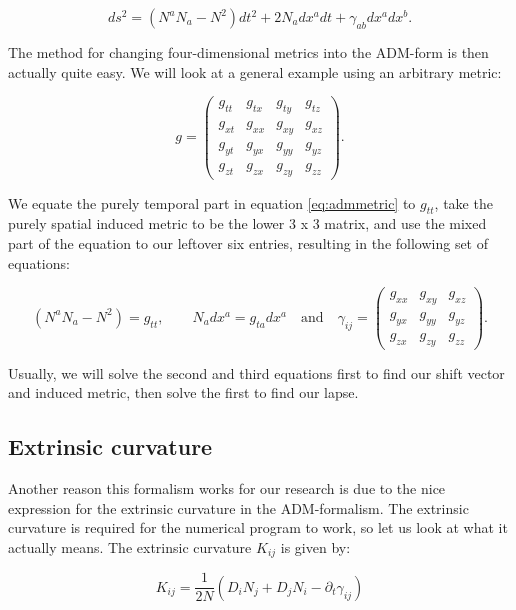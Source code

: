 \documentclass[twoside, openright]{RadboudReport}
\begin{document}
\begin{equation}
	ds^2 = (N^aN_a-N^2)dt^2 +2N_adx^adt+\gamma_{ab}dx^adx^b.
	\label{eq:admmetric}
\end{equation}


The method for changing four-dimensional metrics into the ADM-form is then actually quite easy. We will look at a general example using an arbitrary metric:

\begin{equation}
	g = 
	\begin{pmatrix}
		g_{tt} & g_{tx} & g_{ty} & g_{tz} \\
		g_{xt} & g_{xx} & g_{xy} & g_{xz} \\
		g_{yt} & g_{yx} & g_{yy} & g_{yz} \\
		g_{zt} & g_{zx} & g_{zy} & g_{zz} 
	\end{pmatrix}.
\end{equation}

We equate the purely temporal part in equation \ref{eq:admmetric} to $g_{tt}$, take the purely spatial induced metric to be the lower 3 x 3 matrix, and use the mixed part of the equation to our leftover six entries, resulting in the following set of equations:

\begin{equation}
	(N^aN_a-N^2) = g_{tt}, \qquad N_adx^a = g_{ta}dx^a \quad \text{and} \quad \gamma_{ij} = 
	\begin{pmatrix}
		g_{xx} & g_{xy} & g_{xz} \\
		g_{yx} & g_{yy} & g_{yz} \\
		g_{zx} & g_{zy} & g_{zz} 
	\end{pmatrix}.
\end{equation}

Usually, we will solve the second and third equations first to find our shift vector and induced metric, then solve the first to find our lapse.

\subsection{Extrinsic curvature}

Another reason this formalism works for our research is due to the nice expression for the extrinsic curvature in the ADM-formalism. The extrinsic curvature is required for the numerical program to work, so let us look at what it actually means. The extrinsic curvature $K_{ij}$ is given by:

\begin{equation}
	K_{ij} = \frac{1}{2N}(D_i N_j + D_j N_i - \partial_t\gamma_{ij})
	\label{eq:extrinsiccurvature}
\end{equation}
\end{document}
